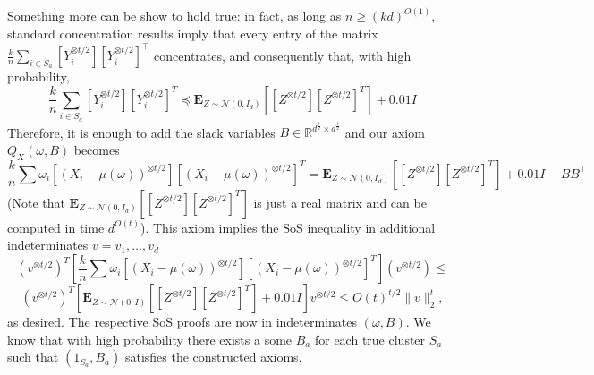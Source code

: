 \documentclass[12pt]{article}%
\newcommand{\expect}{\mathbf{E}}
\begin{document}
\noindent
Something more can be show to hold true: in fact, as long as $n \geq (kd)^{O(1)}$, standard concentration results imply that every entry of the matrix $\tfrac k n \sum_{i \in S_a} \left [ Y_i^{\otimes t/2} \right ] \left [ Y_i^{\otimes t/2} \right ]^\top$ concentrates, and consequently that, with high probability,
$$
\frac{k}{n}
\sum_{i \in S_a}
\left[Y_i^{\otimes t/2}\right]
\left[Y_i^{\otimes t/2}\right]^T \preceq 
 \expect_{Z \sim \mathcal{N}(0,I_d)} \left[
\left[Z^{\otimes t/2}\right]
\left[Z^{\otimes t/2}\right]^T \right] + 0.01 I
$$
Therefore, it is enough to add the slack variables 
$B \in \mathbb{R}^{d^{\frac{t}{2}}\times d^{\frac{t}{2}}}$ and our axiom $Q_X(\omega, B)$ becomes
$$
\frac{k}{n}
\sum \omega_i
\left[(X_i - \mu(\omega))^{\otimes t/2}\right]
\left[(X_i - \mu(\omega))^{\otimes t/2}\right]^T  =
\expect_{Z \sim \mathcal{N}(0,I_d)} \left[
\left[Z^{\otimes t/2}\right]
\left[Z^{\otimes t/2}\right]^T \right] + 0.01 I - BB^\top
$$
(Note that $\expect_{Z \sim \mathcal{N}(0,I_d)} \left[
\left[Z^{\otimes t/2}\right]
\left[Z^{\otimes t/2}\right]^T \right]$
is just a real matrix and can be computed in time $d^{O(t)}$).
This axiom implies the SoS inequality in additional indeterminates $v = v_1,\ldots,v_d$
$$
(v^{\otimes t/2})^T
\left[
\frac{k}{n}
\sum \omega_i
\left[(X_i - \mu(\omega))^{\otimes t/2}\right]
\left[(X_i - \mu(\omega))^{\otimes t/2}\right]^T
\right]
(v^{\otimes t/2})
\le $$
$$
(v^{\otimes t/2})^T \left[\expect_{Z \sim \mathcal{N}(0,I)} \left[
\left[Z^{\otimes t/2}\right]
\left[Z^{\otimes t/2}\right]^T \right] + 0.01 I\right] 
v^{\otimes t/2}\le 
O(t)^{t/2} \|v\|_2^t,
$$
as desired. The respective SoS proofs are now in indeterminates $(\omega, B).$ We know that with high probability there exists a some $B_a$ for each true cluster 
$S_a$ such that $(1_{S_a}, B_a)$ satisfies the constructed axioms. 

\printbibliography

\appendix
\end{document}
